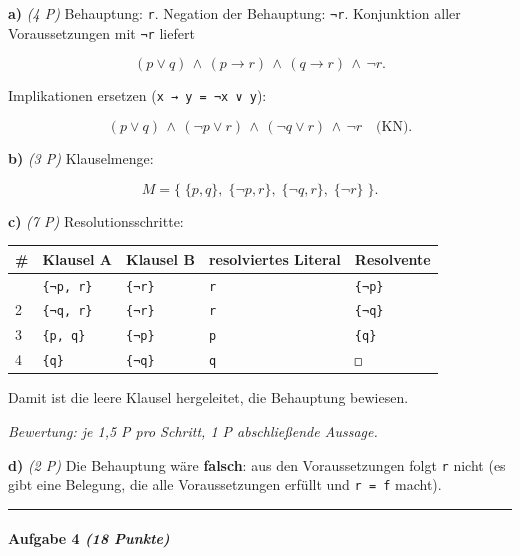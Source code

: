 \documentclass[11pt, a4paper]{article}
\begin{document}
\textbf{a)} \textit{(4 P)} Behauptung: \texttt{r}. Negation der Behauptung: \texttt{¬r}. Konjunktion aller Voraussetzungen mit \texttt{¬r} liefert

\[
(p \lor q) \,\land\, (p \to r) \,\land\, (q \to r) \,\land\, \neg r.
\]

Implikationen ersetzen (\texttt{x → y = ¬x ∨ y}):

\[
(p \lor q) \,\land\, (\neg p \lor r) \,\land\, (\neg q \lor r) \,\land\, \neg r \quad\text{(KN).}
\]


\textbf{b)} \textit{(3 P)} Klauselmenge:

\[
M = \{\;\{p, q\},\; \{\neg p, r\},\; \{\neg q, r\},\; \{\neg r\}\;\}.
\]


\textbf{c)} \textit{(7 P)} Resolutionsschritte:



{\small
\begin{tabularx}{\linewidth}{XXXXX}
\hline
\rowcolor{tableheadbg}
{\color{white}\textbf{\#}} & {\color{white}\textbf{Klausel A}} & {\color{white}\textbf{Klausel B}} & {\color{white}\textbf{resolviertes Literal}} & {\color{white}\textbf{Resolvente}} \\[2pt]
\hline
\endhead
\hline
\endfoot
1 & \texttt{\{¬p, r\}} & \texttt{\{¬r\}} & \texttt{r} & \texttt{\{¬p\}} \\
2 & \texttt{\{¬q, r\}} & \texttt{\{¬r\}} & \texttt{r} & \texttt{\{¬q\}} \\
3 & \texttt{\{p, q\}} & \texttt{\{¬p\}} & \texttt{p} & \texttt{\{q\}} \\
4 & \texttt{\{q\}} & \texttt{\{¬q\}} & \texttt{q} & \texttt{□} \\
\end{tabularx}
}


Damit ist die leere Klausel hergeleitet, die Behauptung bewiesen.


\textit{Bewertung: je 1,5 P pro Schritt, 1 P abschließende Aussage.}


\textbf{d)} \textit{(2 P)} Die Behauptung wäre \textbf{falsch}: aus den Voraussetzungen folgt \texttt{r} nicht (es gibt eine Belegung, die alle Voraussetzungen erfüllt und \texttt{r = f} macht).



\noindent\textcolor{rulegray}{\rule{\linewidth}{0.4pt}}


\paragraph{Aufgabe 4 \textit{(18 Punkte)}}\mbox{}\\[2pt]
\end{document}
